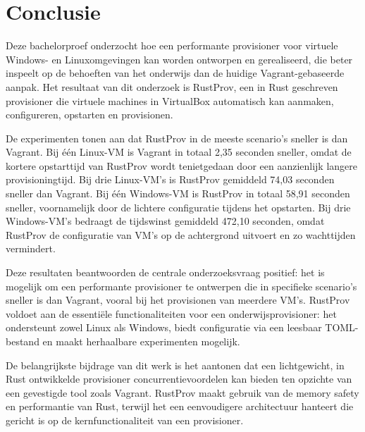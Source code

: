 
\chapter{Conclusie}%
\label{ch:conclusie}


Deze bachelorproef onderzocht hoe een performante provisioner voor virtuele Windows- en Linuxomgevingen kan worden ontworpen en gerealiseerd, die beter inspeelt op de behoeften van het onderwijs dan de huidige Vagrant-gebaseerde aanpak. Het resultaat van dit onderzoek is RustProv, een in Rust geschreven provisioner die virtuele machines in VirtualBox automatisch kan aanmaken, configureren, opstarten en provisionen.

De experimenten tonen aan dat RustProv in de meeste scenario's sneller is dan Vagrant. Bij één Linux-VM is Vagrant in totaal 2,35 seconden sneller, omdat de kortere opstarttijd van RustProv wordt tenietgedaan door een aanzienlijk langere provisioningtijd. Bij drie Linux-VM's is RustProv gemiddeld 74,03 seconden sneller dan Vagrant. Bij één Windows-VM is RustProv in totaal 58,91 seconden sneller, voornamelijk door de lichtere configuratie tijdens het opstarten. Bij drie Windows-VM's bedraagt de tijdswinst gemiddeld 472,10 seconden, omdat RustProv de configuratie van VM's op de achtergrond uitvoert en zo wachttijden vermindert.

Deze resultaten beantwoorden de centrale onderzoeksvraag positief: het is mogelijk om een performante provisioner te ontwerpen die in specifieke scenario's sneller is dan Vagrant, vooral bij het provisionen van meerdere VM's. RustProv voldoet aan de essentiële functionaliteiten voor een onderwijsprovisioner: het ondersteunt zowel Linux als Windows, biedt configuratie via een leesbaar TOML-bestand en maakt herhaalbare experimenten mogelijk.

De belangrijkste bijdrage van dit werk is het aantonen dat een lichtgewicht, in Rust ontwikkelde provisioner concurrentievoordelen kan bieden ten opzichte van een gevestigde tool zoals Vagrant. RustProv maakt gebruik van de memory safety en performantie van Rust, terwijl het een eenvoudigere architectuur hanteert die gericht is op de kernfunctionaliteit van een provisioner.

